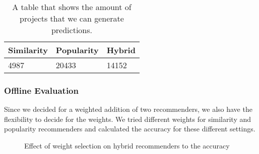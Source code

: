\begin{table}[htpb]
	\caption[The number of predicted projects]{A table that shows the amount of projects that we can generate predictions.}\label{tab:evaluation-amount-prediction}
	\centering
	\begin{tabular}{l l l}
		\toprule
		Similarity & Popularity & Hybrid \\
		\midrule
		4987 & 20433 & 14152 \\
		\bottomrule
	\end{tabular}
\end{table}


\subsubsection{Offline Evaluation}

Since we decided for a weighted addition of two recommenders, we also have the flexibility to decide for the weights. We tried different weights for similarity and popularity recommenders and calculated the accuracy for these different settings. 


\begin{figure}[htpb]
	\centering
	
	\exampleA
	\exampleB
	\caption[Weight figure]{Effect of weight selection on hybrid recommenders to the accuracy}\label{fig:weight-selection}
\end{figure}

